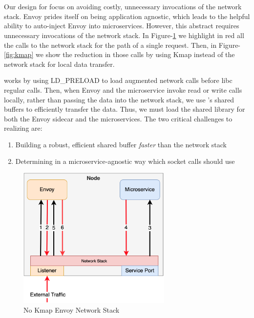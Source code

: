 \section{\sysname}
\label{sec:design}
Our design for \sysname focus on avoiding costly, unnecessary invocations of the network stack.
Envoy prides itself on being application agnostic, which leads to the helpful ability to auto-inject Envoy into microservices.
However, this abstract requires unnecessary invocations of the network stack.
In Figure-\ref{fig:no_kmap} we highlight in red all the calls to the network stack for the path of a single request.
Then, in Figure-\ref{fig:kmap} we show the reduction in those calls by using Kmap instead of the network stack for local data transfer.

\sysname works by using LD\_PRELOAD to load augmented network calls before libc regular calls.
Then, when Envoy and the microservice invoke read or write calls locally, rather than passing the data
into the network stack, we use \sysname's shared buffers to efficiently transfer the data.
Thus, we must load the shared library for both the Envoy sidecar and the microservices.
The two critical challenges to realizing \sysname are:
\begin{enumerate}
    \item Building a robust, efficient shared buffer \textit{faster} than the network stack
    \item Determining in a microservice-agnostic way which socket calls should use \sysname
\end{enumerate}

\begin{figure}[!htb]
    \begin{minipage}{0.5\textwidth}
        \centering
        \includegraphics[keepaspectratio=true,width=3in]{figures/design/no_kmap.png}
        \caption{No Kmap Envoy Network Stack}
        \label{fig:no_kmap}
    \end{minipage}%
\end{figure}

